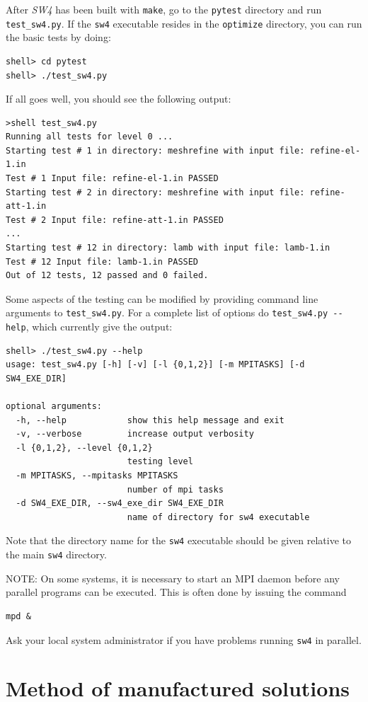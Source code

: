\documentclass[11pt]{report}
\begin{document}
After \emph{SW4} has been built with \verb+make+, go to the \verb+pytest+ directory and run
\verb+test_sw4.py+. If the \verb+sw4+ executable resides in the \verb+optimize+ directory, you can
run the basic tests by doing:
\begin{verbatim}
shell> cd pytest
shell> ./test_sw4.py
\end{verbatim}
If all goes well, you should see the following output:
\begin{verbatim}
>shell test_sw4.py
Running all tests for level 0 ...
Starting test # 1 in directory: meshrefine with input file: refine-el-1.in
Test # 1 Input file: refine-el-1.in PASSED
Starting test # 2 in directory: meshrefine with input file: refine-att-1.in
Test # 2 Input file: refine-att-1.in PASSED
...
Starting test # 12 in directory: lamb with input file: lamb-1.in
Test # 12 Input file: lamb-1.in PASSED
Out of 12 tests, 12 passed and 0 failed.
\end{verbatim}
Some aspects of the testing can be modified by providing command line arguments to
\verb+test_sw4.py+. For a complete list of options do \verb+test_sw4.py --help+, which currently
give the output:
\begin{verbatim}
shell> ./test_sw4.py --help
usage: test_sw4.py [-h] [-v] [-l {0,1,2}] [-m MPITASKS] [-d SW4_EXE_DIR]

optional arguments:
  -h, --help            show this help message and exit
  -v, --verbose         increase output verbosity
  -l {0,1,2}, --level {0,1,2}
                        testing level
  -m MPITASKS, --mpitasks MPITASKS
                        number of mpi tasks
  -d SW4_EXE_DIR, --sw4_exe_dir SW4_EXE_DIR
                        name of directory for sw4 executable
\end{verbatim}
Note  that the directory name for the \verb+sw4+ executable should be given relative to the main
\verb+sw4+ directory.

NOTE: On some systems, it is necessary to start an MPI daemon before any parallel programs can be
executed. This is often done by issuing the command
\begin{verbatim}
mpd &
\end{verbatim}
Ask your local system administrator if you have problems running \verb+sw4+ in parallel.

\section{Method of manufactured solutions}\label{sec:twilight}
\end{document}
